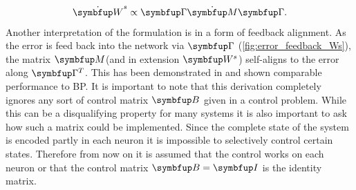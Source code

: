 \begin{equation}
	\dot{\bmu{W}}^s \propto \bmu{\Gamma}\dot{\bmu{M}}\bmu{\Gamma}.
\end{equation}
Another interpretation of the formulation is in a form of feedback alignment. As the error is feed back into the network via $\bmu{\Gamma}$ (\ref{fig:error_feedback_Ws}), the matrix $\bmu{M}$(and in extension $\bmu{W}^s$) self-aligns to the error along $\bmu{\Gamma}^T$.
This has been demonstrated in \cite{lillicrap_random_2016} and shown comparable performance to \ac{BP}.
It is important to note that this derivation completely ignores any sort of control matrix $\bmu{B}$ given in a control problem. While this can be a disqualifying property for many systems it is also important to ask how such a matrix could be implemented. Since the complete state of the system is encoded partly in each neuron it is impossible to selectively control certain states. Therefore from now on it is assumed that the control works on each neuron or that the control matrix $\bmu{B} = \bmu{I}$ is the identity matrix.
